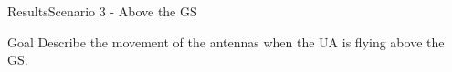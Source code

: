 
\begin{frame}{Results}{Scenario 3 - Above the GS}

  \begin{block}{Goal}
	Describe the movement of the antennas when the UA is flying above the GS.
  \end{block}

  \begin{figure}[H]
    \centerline{
    \hfill
    }
  \end{figure}

\end{frame}



